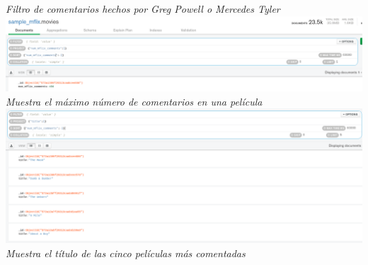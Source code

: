 \documentclass[10pt]{article}
\begin{document}
\begin{center}
  \textit{Filtro de comentarios hechos por Greg Powell o Mercedes Tyler}\\
  \includegraphics[scale=0.35]{imgs/e2_3.png}\\
  \textit{Muestra el máximo número de comentarios en una película}\\
  \includegraphics[scale=0.35]{imgs/e2_4.png}\\
  \textit{Muestra el título de las cinco películas más comentadas}
\end{center}
\clearpage
\end{document}
